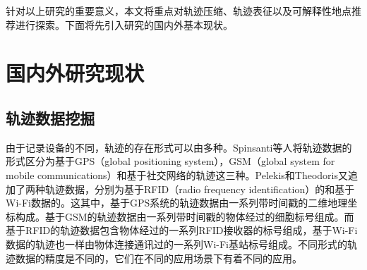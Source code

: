 针对以上研究的重要意义，本文将重点对轨迹压缩、轨迹表征以及可解释性地点推荐进行探索。下面将先引入研究的国内外基本现状。


\section{国内外研究现状}
\subsection{轨迹数据挖掘}




由于记录设备的不同，轨迹的存在形式可以由多种。Spinsanti等人将轨迹数据的形式区分为基于GPS（global positioning system），GSM（global system for mobile communications）和基于社交网络的轨迹这三种。Pelekis和Theodoris又追加了两种轨迹数据，分别为基于RFID（radio frequency identification）的和基于Wi-Fi数据的。这其中，基于GPS系统的轨迹数据由一系列带时间戳的二维地理坐标构成。基于GSM的轨迹数据由一系列带时间戳的物体经过的细胞标号组成。而基于RFID的轨迹数据包含物体经过的一系列RFID接收器的标号组成，基于Wi-Fi数据的轨迹也一样由物体连接通讯过的一系列Wi-Fi基站标号组成。不同形式的轨迹数据的精度是不同的，它们在不同的应用场景下有着不同的应用。

